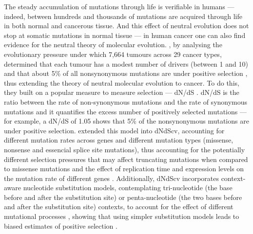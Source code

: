 The steady accumulation of mutations through life is verifiable in humans \cite{Lee-Six2018-lp,Williams2020-ji,Yoshida2020-zi} --- indeed, between hundreds and thousands of mutations are acquired through life in both normal and cancerous tissue. And this effect of neutral evolution does not stop at somatic mutations in normal tissue --- in human cancer one can also find evidence for the neutral theory of molecular evolution. , by analysing the evolutionary pressure under which 7,664 tumours across 29 cancer types, determined that each tumour has a modest number of drivers (between 1 and 10) and that about 5\% of all nonsynonymous mutations are under positive selection \cite{Martincorena2017-ii}, thus extending the theory of neutral molecular evolution to cancer. To do this, they built on a popular measure to measure selection --- dN/dS \cite{Miyata1980-mt}. dN/dS is the ratio between the rate of non-synonymous mutations and the rate of synonymous mutations and it quantifies the excess number of positively selected mutations --- for example, a dN/dS of 1.05 shows that 5\% of the nonsynonymous mutations are under positive selection.  extended this model into dNdScv, accounting for different mutation rates across genes and different mutation types (missense, nonsense and essencial splice site mutations), thus accounting for the potentially different selection pressures that may affect truncating mutations when compared to missense mutations and the effect of replication time and expression levels on the mutation rate of different genes \cite{Lawrence2013-rw}. Additionally, dNdScv incorporates context-aware nucleotide substitution models, contemplating tri-nucleotide (the base before and after the substitution site) or penta-nucleotide (the two bases before and after the substitution site) contexts, to account for the effect of different mutational processes \cite{Alexandrov2013-kl}, showing that using simpler substitution models leads to biased estimates of positive selection \cite{Martincorena2017-ii}. 

